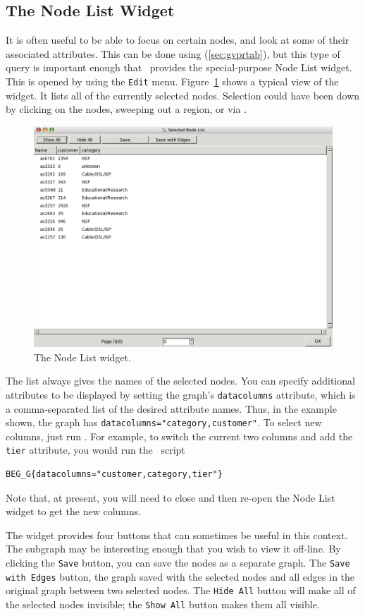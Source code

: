 \subsection{The Node List Widget}
\label{sec:nodelist}
It is often useful to be able to focus on certain nodes, and look at some of their associated attributes. 
This can be done using \gvpr (\ref{sec:gvprtab}), but this type of query is important enough that \smyrna\
provides the special-purpose Node List widget. This is opened by using the {\tt Edit} menu.
Figure~\ref{fig:nodelist} shows a typical view of the widget. It lists all of the currently selected nodes.
Selection could have been down by clicking on the nodes, sweeping out a region, or via \gvpr.
\begin{figure}[ht]
\begin{center}
\includegraphics[scale=.35]{figures/nodelist.png}
\caption{\small The Node List widget.}
\label{fig:nodelist}
\end{center}
\end{figure}
The list always gives the names of the selected nodes. You can specify additional attributes to be
displayed by setting the graph's {\tt datacolumns} attribute, which is a comma-separated list of the
desired attribute names. Thus, in the example shown, the graph has {\tt datacolumns="category,customer"}.
To select new columns, just run \gvpr. For example, to switch the current two columns and add the
{\tt tier} attribute, you would run the \gvpr\ script
\begin{verbatim}
BEG_G{datacolumns="customer,category,tier"}
\end{verbatim}
Note that, at present, you will need to close and then re-open the Node List widget to get the new columns.

The widget provides four buttons that can sometimes be useful in this context. The subgraph may be
interesting enough that you wish to view it off-line. By clicking the {\tt Save} button, you can save
the nodes as a separate graph. The {\tt Save with Edges} button, the graph saved with the selected nodes
and all edges in the original graph between two selected nodes. The {\tt Hide All} button will make all of 
the selected nodes invisible; the {\tt Show All} button makes them all visible.
